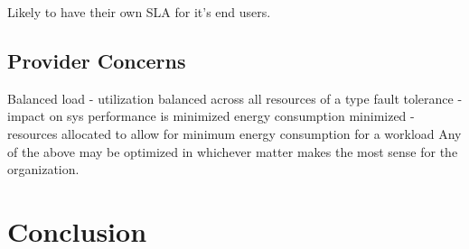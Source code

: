 \documentclass[fullapage,12pt]{article}
\begin{document}
\cite{Jennings2015}
Likely to have their own SLA for it's end users.


\subsection{Provider Concerns} \label{provider-concerns}


\cite{Jennings2015}
Balanced load - utilization balanced across all resources of a type
fault tolerance - impact on sys performance is minimized
energy consumption minimized - resources allocated to allow for minimum energy consumption for a workload
Any of the above may be optimized in whichever matter makes the most sense for the organization.




\section{Conclusion}





\end{document}
